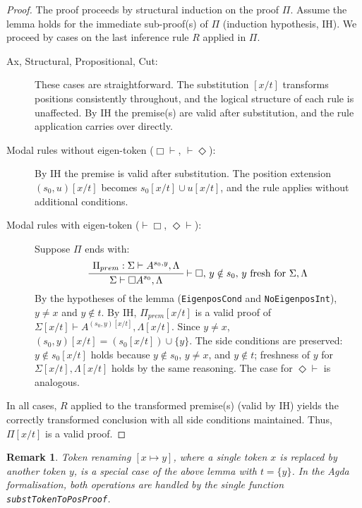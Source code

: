 \documentclass{article}
\newcommand{\seq}[2]{{#1} \vdash{} {#2}}
\newcommand{\pf}[2]{{#1}^{#2}} %
\newtheorem{remark}[theorem]{Remark}
\theoremstyle{definition}
\begin{document}
\begin{proof}
The proof proceeds by structural induction on the proof $\Pi$. Assume the lemma holds for the immediate sub-proof(s) of $\Pi$ (induction hypothesis, IH). We proceed by cases on the last inference rule $R$ applied in $\Pi$.

\begin{description}
    \item[Ax, Structural, Propositional, Cut:] These cases are straightforward. The substitution $[x/t]$ transforms positions consistently throughout, and the logical structure of each rule is unaffected. By IH the premise(s) are valid after substitution, and the rule application carries over directly.

    \item[Modal rules without eigen-token ($\Box \vdash$, $\vdash \Diamond$):] By IH the premise is valid after substitution. The position extension $(s_0,u)[x/t]$ becomes $s_0[x/t] \cup u[x/t]$, and the rule applies without additional conditions.

    \item[Modal rules with eigen-token ($\vdash \Box$, $\Diamond \vdash$):] Suppose $\Pi$ ends with:
            \[
            \AxiomC{$\Pi_{prem}: \seq{\Sigma}{\pf{A}{s_0,y}, \Lambda}$}
            \RightLabel{$\vdash \Box$, $y \notin s_0$, $y$ fresh for $\Sigma, \Lambda$}
            \UnaryInfC{$\seq{\Sigma}{\pf{\Box A}{s_0}, \Lambda}$}
            \DisplayProof
            \]
            By the hypotheses of the lemma (\texttt{EigenposCond} and \texttt{NoEigenposInt}), $y \neq x$ and $y \notin t$.
            By IH, $\Pi_{prem}[x/t]$ is a valid proof of $\seq{\Sigma[x/t]}{\pf{A}{(s_0,y)[x/t]}, \Lambda[x/t]}$.
            Since $y \neq x$, $(s_0,y)[x/t] = (s_0[x/t]) \cup \{y\}$.
            The side conditions are preserved: $y \notin s_0[x/t]$ holds because $y \notin s_0$, $y \neq x$, and $y \notin t$; freshness of $y$ for $\Sigma[x/t], \Lambda[x/t]$ holds by the same reasoning.
            The case for $\Diamond \vdash$ is analogous.
\end{description}
In all cases, $R$ applied to the transformed premise(s) (valid by IH) yields the correctly transformed conclusion with all side conditions maintained. Thus, $\Pi[x/t]$ is a valid proof.
\end{proof}

\begin{remark}
Token renaming $[x \mapsto y]$, where a single token $x$ is replaced by another token $y$, is a special case of the above lemma with $t = \{y\}$. In the Agda formalisation, both operations are handled by the single function \texttt{substTokenToPosProof}.
\end{remark}
\end{document}
